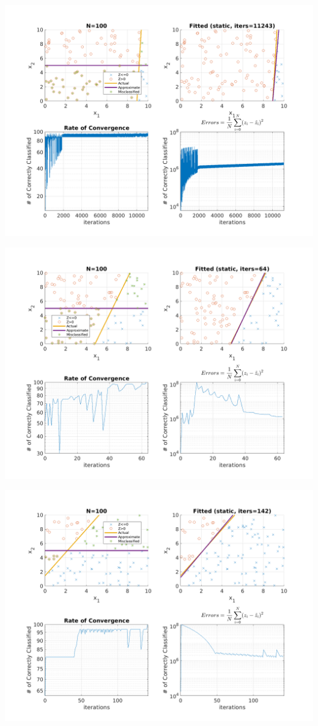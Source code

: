 \documentclass{article}
\newenvironment{Figure}
  {\par\medskip\noindent\minipage{\linewidth}}
  {\endminipage\par\medskip}
\begin{document}
\begin{multicols}{2}
\begin{Figure}
\centering
\includegraphics[width=\linewidth]{pngs/n100_static1.png}
\end{Figure}
\begin{Figure}
\centering
\includegraphics[width=\linewidth]{pngs/n100_static2.png}
\end{Figure}
\begin{Figure}
\centering
\includegraphics[width=\linewidth]{pngs/n100_static3.png}

\end{Figure}
\end{multicols}
\end{document}
